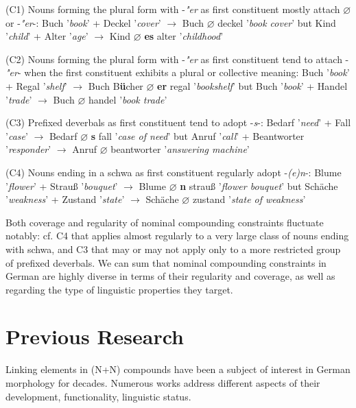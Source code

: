 \documentclass[10pt, a4paper]{article}
\newcommand{\zeroLinker}{\ensuremath{\boldsymbol{\varnothing}}}
\newcommand{\compEx}[7]{%
    #1 '\textit{#2}' + #4 '\textit{#5}'
    $\rightarrow$
    \if\relax\detokenize{#6}\relax
      #1%
    \else
      #6%
    \fi
    \if\relax\detokenize{#3}\relax
      \zeroLinker%
    \else
      \textbf{#3}%
    \fi
    \MakeLowercase{#4} '\textit{#7}'%
}
\begin{document}
\begin{tcolorbox}[breakable, left=0.2em, right=0.2em]

    (C1) Nouns forming the plural form with -\textit{"er} as first constituent mostly attach \zeroLinker or -\textit{"er}-: \compEx{Buch}{book}{}{Deckel}{cover}{}{book cover} but \compEx{Kind}{child}{es}{Alter}{age}{}{childhood}

    \vspace{0.5em}

    (C2) Nouns forming the plural form with -\textit{"er} as first constituent tend to attach -\textit{"er}- when the first constituent exhibits a plural or collective meaning: \compEx{Buch}{book}{er}{Regal}{shelf}{B\textbf{ü}cher}{bookshelf} but \compEx{Buch}{book}{}{Handel}{trade}{}{book trade}

    \vspace{0.5em}

    (C3) Prefixed deverbals as first constituent tend to adopt -\textit{s}-: \compEx{Bedarf}{need}{s}{Fall}{case}{}{case of need} but \compEx{Anruf}{call}{}{Beantworter}{responder}{}{answering machine}

    \vspace{0.5em}
    
    (C4) Nouns ending in a schwa as first constituent regularly adopt -\textit{(e)n}-: \compEx{Blume}{flower}{n}{Strauß}{bouquet}{}{flower bouquet} but \compEx{Schäche}{weakness}{}{Zustand}{state}{}{state of weakness}
        
\end{tcolorbox}

Both coverage and regularity of nominal compounding constraints fluctuate notably: cf. C4 that applies almost regularly to a very large class of nouns ending with schwa, and C3 that may or may not apply only to a more restricted group of prefixed deverbals. We can sum that nominal compounding constraints in German are highly diverse in terms of their regularity and coverage, as well as regarding the type of linguistic properties they target.



\section{Previous Research}
\label{sec:back}

Linking elements in (N+N) compounds have been a subject of interest in German morphology for decades. Numerous works address different aspects of their development, functionality, linguistic status.
\end{document}
